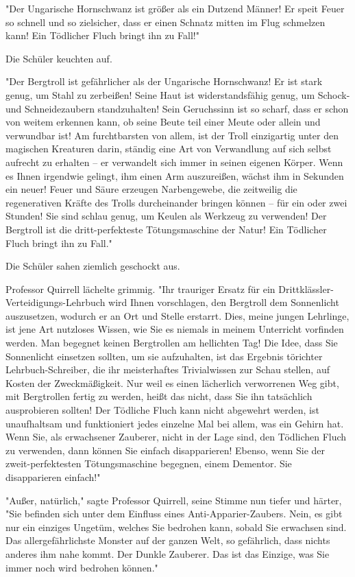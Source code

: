 {"Der Ungarische Hornschwanz ist größer als ein Dutzend Männer! Er speit Feuer so schnell und so zielsicher, dass er einen Schnatz mitten im Flug schmelzen kann! Ein Tödlicher Fluch bringt ihn zu Fall!"

Die Schüler keuchten auf.

"Der Bergtroll ist gefährlicher als der Ungarische Hornschwanz! Er ist stark genug, um Stahl zu zerbeißen! Seine Haut ist widerstandsfähig genug, um Schock- und Schneidezaubern standzuhalten! Sein Geruchssinn ist so scharf, dass er schon von weitem erkennen kann, ob seine Beute teil einer Meute oder allein und verwundbar ist! Am furchtbarsten von allem, ist der Troll einzigartig unter den magischen Kreaturen darin, ständig eine Art von Verwandlung auf sich selbst aufrecht zu erhalten -- er verwandelt sich immer in seinen eigenen Körper. Wenn es Ihnen irgendwie gelingt, ihm einen Arm auszureißen, wächst ihm in Sekunden ein neuer! Feuer und Säure erzeugen Narbengewebe, die zeitweilig die regenerativen Kräfte des Trolls durcheinander bringen können -- für ein oder zwei Stunden! Sie sind schlau genug, um Keulen als Werkzeug zu verwenden! Der Bergtroll ist die dritt-perfekteste Tötungsmaschine der Natur! Ein Tödlicher Fluch bringt ihn zu Fall."

Die Schüler sahen ziemlich geschockt aus.

Professor Quirrell lächelte grimmig. "Ihr trauriger Ersatz für ein Drittklässler-Verteidigungs-Lehrbuch wird Ihnen vorschlagen, den Bergtroll dem Sonnenlicht auszusetzen, wodurch er an Ort und Stelle erstarrt. Dies, meine jungen Lehrlinge, ist jene Art nutzloses Wissen, wie Sie es niemals in meinem Unterricht vorfinden werden. Man begegnet keinen Bergtrollen am hellichten Tag! Die Idee, dass Sie Sonnenlicht einsetzen sollten, um sie aufzuhalten, ist das Ergebnis törichter Lehrbuch-Schreiber, die ihr meisterhaftes Trivialwissen zur Schau stellen, auf Kosten der Zweckmäßigkeit. Nur weil es einen lächerlich verworrenen Weg gibt, mit Bergtrollen fertig zu werden, heißt das nicht, dass Sie ihn tatsächlich ausprobieren sollten! Der Tödliche Fluch kann nicht abgewehrt werden, ist unaufhaltsam und funktioniert jedes einzelne Mal bei allem, was ein Gehirn hat. Wenn Sie, als erwachsener Zauberer, nicht in der Lage sind, den Tödlichen Fluch zu verwenden, dann können Sie einfach disapparieren! Ebenso, wenn Sie der zweit-perfektesten Tötungsmaschine begegnen, einem Dementor. Sie disapparieren einfach!"

"Außer, natürlich," sagte Professor Quirrell, seine Stimme nun tiefer und härter, "Sie befinden sich unter dem Einfluss eines Anti-Apparier-Zaubers. Nein, es gibt nur ein einziges Ungetüm, welches Sie bedrohen kann, sobald Sie erwachsen sind. Das allergefährlichste Monster auf der ganzen Welt, so gefährlich, dass nichts anderes ihm nahe kommt. Der Dunkle Zauberer. Das ist das Einzige, was Sie immer noch wird bedrohen können."

}
